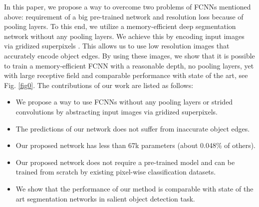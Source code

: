 \documentclass[a4paper,conference]{IEEEtran}
\begin{document}

In this paper, we propose a way to overcome two problems of FCNNs mentioned above: requirement of a big pre-trained network and resolution loss because of pooling layers.
To this end, we utilize a memory-efficient deep segmentation network without any pooling layers.
We achieve this by encoding input images via gridized superpixels \cite{Fu}.
This allows us to use low resolution images that accurately encode object edges.
By using these images, we show that it is possible to train a memory-efficient FCNN with a reasonable depth, no pooling layers, yet with large receptive field and comparable performance with state of the art, see Fig. \ref{fig0}.
The contributions of our work are listed as follows:

\begin{itemize}
  \item We propose a way to use FCNNs without any pooling layers or strided convolutions by abstracting input images via gridized superpixels.
  \item The predictions of our network does not suffer from inaccurate object edges.
  \item Our proposed network has less than 67k parameters (about 0.048\% of others).
  \item Our proposed network does not require a pre-trained model and can be trained from scratch by existing pixel-wise classification datasets.
  \item We show that the performance of our method is comparable with state of the art segmentation networks in salient object detection task.
\end{itemize}
\end{document}
